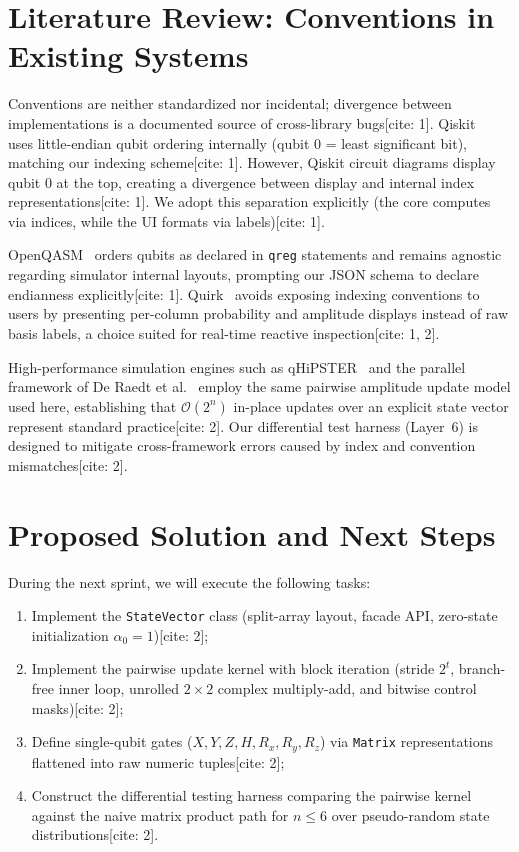 \documentclass[conference]{IEEEtran}
\begin{document}
\section{Literature Review: Conventions in Existing Systems}
Conventions are neither standardized nor incidental; divergence between implementations is a documented source of cross-library bugs[cite: 1]. Qiskit~\cite{qiskit} uses little-endian qubit ordering internally (qubit 0 = least significant bit), matching our indexing scheme[cite: 1]. However, Qiskit circuit diagrams display qubit 0 at the top, creating a divergence between display and internal index representations[cite: 1]. We adopt this separation explicitly (the core computes via indices, while the UI formats via labels)[cite: 1]. 

OpenQASM~\cite{openqasm} orders qubits as declared in \texttt{qreg} statements and remains agnostic regarding simulator internal layouts, prompting our JSON schema to declare endianness explicitly[cite: 1]. Quirk~\cite{quirk} avoids exposing indexing conventions to users by presenting per-column probability and amplitude displays instead of raw basis labels, a choice suited for real-time reactive inspection[cite: 1, 2]. 

High-performance simulation engines such as qHiPSTER~\cite{qhipster} and the parallel framework of De Raedt et al.~\cite{deraedt} employ the same pairwise amplitude update model used here, establishing that $\mathcal{O}(2^n)$ in-place updates over an explicit state vector represent standard practice[cite: 2]. Our differential test harness (Layer~6) is designed to mitigate cross-framework errors caused by index and convention mismatches[cite: 2].

\section{Proposed Solution and Next Steps}
During the next sprint, we will execute the following tasks:
\begin{enumerate}
    \item Implement the \texttt{StateVector} class (split-array layout, facade API, zero-state initialization $\alpha_0 = 1$)[cite: 2];
    \item Implement the pairwise update kernel with block iteration (stride $2^t$, branch-free inner loop, unrolled $2 \times 2$ complex multiply-add, and bitwise control masks)[cite: 2];
    \item Define single-qubit gates ($X, Y, Z, H, R_x, R_y, R_z$) via \texttt{Matrix} representations flattened into raw numeric tuples[cite: 2];
    \item Construct the differential testing harness comparing the pairwise kernel against the naive matrix product path for $n \le 6$ over pseudo-random state distributions[cite: 2].
\end{enumerate}
\end{document}
